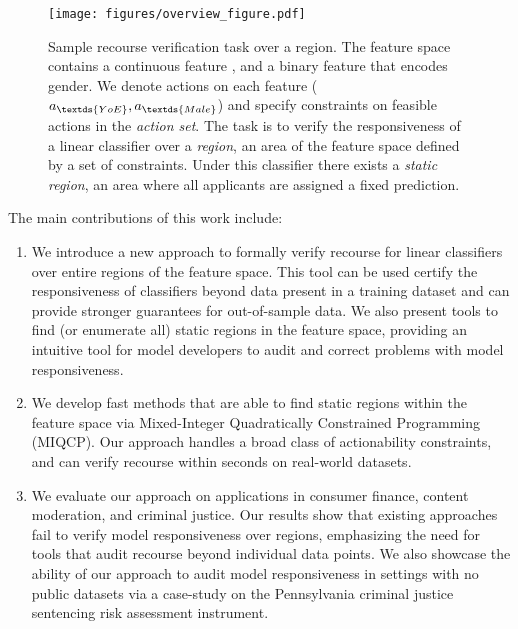 \begin{figure*}
    \centering
    \texttt{[image: figures/overview\_figure.pdf]}
    \vspace{-3em}
    \caption{Sample recourse verification task over a region. The feature space contains a continuous feature , and a binary feature  that encodes gender. We denote actions on each feature ($a_{\textds{YoE}}, a_{\textds{Male}}$) and specify constraints on feasible actions in the \emph{action set}. The task is to verify the responsiveness of a linear classifier over a \emph{region}, an area of the feature space defined by a set of constraints. Under this classifier there exists a \emph{static region}, an area where all applicants are assigned a fixed prediction. }
    \label{fig:summary}
    \vspace{-1em}
\end{figure*}

The main contributions of this work include:
\begin{enumerate}[leftmargin=*,itemsep=0]
    \item We introduce a new approach to formally verify recourse for linear classifiers over entire regions of the feature space. This tool can be used certify the responsiveness of classifiers beyond data present in a training dataset and can provide stronger guarantees for out-of-sample data. We also present tools to find (or enumerate all) static regions in the feature space, providing an intuitive tool for model developers to audit and correct problems with model responsiveness.

    \item We develop fast methods that are able to find static regions within the feature space via Mixed-Integer Quadratically Constrained Programming (MIQCP). Our approach handles a broad class of actionability constraints, and can verify recourse within seconds on real-world datasets.
    
    \item We evaluate our approach on applications in consumer finance, content moderation, and criminal justice. Our results show that existing approaches fail to verify model responsiveness over regions, emphasizing the need for tools that audit recourse beyond individual data points. We also showcase the ability of our approach to audit model responsiveness in settings with no public datasets via a case-study on the Pennsylvania criminal justice sentencing risk assessment instrument.


    
\end{enumerate}


